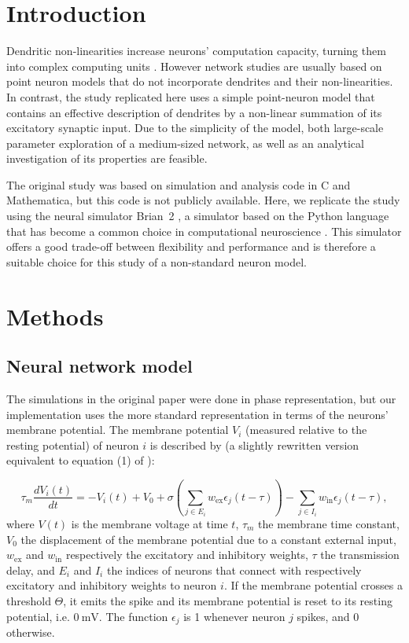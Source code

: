 \documentclass[10pt,a4paper,onecolumn]{article}
\begin{document}
\section*{Introduction}
Dendritic non-linearities increase neurons' computation capacity, turning them into complex computing units \cite{Poirazi2003a}. However network studies are usually based on point neuron models that do not incorporate dendrites and their non-linearities. In contrast, the study replicated here \cite{Memmesheimer2012} uses a simple point-neuron model that contains an effective description of dendrites by a non-linear summation of its excitatory synaptic input. Due to the simplicity of the model, both large-scale parameter exploration of a medium-sized network, as well as an analytical investigation of its properties are feasible.

The original study was based on simulation and analysis code in C and Mathematica, but this code is not publicly available. Here, we replicate the study using the neural simulator Brian~2 \cite{Goodman2009,Stimberg2014}, a simulator based on the Python language that has become a common choice in computational neuroscience \cite{Muller2015}. This simulator offers a good trade-off between flexibility and performance and is therefore a suitable choice for this study of a non-standard neuron model.

\section*{Methods}
\subsection*{Neural network model}
The simulations in the original paper were done in phase representation, but our implementation uses the more standard representation in terms of the neurons' membrane potential. The membrane potential $V_i$ (measured relative to the resting potential) of neuron $i$ is described by (a slightly rewritten version equivalent to equation (1) of \cite{Memmesheimer2012}):

\begin{equation}
\tau_m \frac{dV_i(t)}{dt} = - V_i(t) + V_0 + \sigma \left( \sum_{j\in E_i} w_\text{ex} \epsilon_{j}(t-\tau) \right) - \sum_{j \in I_i} w_\text{in}\epsilon_{j}(t-\tau),
\end{equation}
where $V(t)$ is the membrane voltage at time $t$, $\tau_m$ the membrane time constant, $V_0$ the displacement of the membrane potential due to a constant external input, $w_\text{ex}$ and $w_\text{in}$ respectively the excitatory and inhibitory weights, $\tau$ the transmission delay, and $E_i$ and $I_i$ the indices of neurons that connect with respectively excitatory and inhibitory weights to neuron $i$. If the membrane potential crosses a threshold $\Theta$, it emits the spike and its membrane potential is reset to its resting potential, i.e. $\SI{0}{\milli\volt}$. The function $\epsilon_{j}$ is 1 whenever neuron $j$ spikes, and 0 otherwise.
\end{document}
